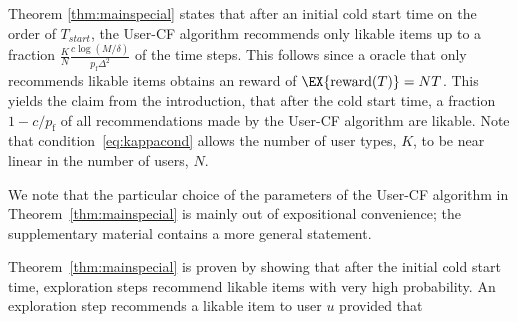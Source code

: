 \documentclass{article}
\newcommand\arewardT{\EX{\mathrm{reward}(T)}}
\newcommand\pf{p_{\mathrm{f}}}
\newcommand\nuser{N} %
\begin{document}


Theorem \ref{thm:mainspecial} states that after an initial cold start time on the order of $T_{start}$, %
the User-CF algorithm recommends only likable items up to a fraction $\frac{K}{N} \frac{c \log(M/\delta)}{ \pf \Delta^2}$ of the time steps. 
This follows since a oracle that only recommends likable items obtains an reward of $\arewardT = NT$. 
This yields the claim from the introduction, that after the cold start time, a fraction $1 - c/\pf$ of all recommendations made by the User-CF algorithm are likable. 
Note that condition~\eqref{eq:kappacond} allows the number of user types, $K$,
to be near linear in the number of users, $N$. 

We note that the particular choice of the parameters of the User-CF algorithm in Theorem~\ref{thm:mainspecial} is mainly out of expositional convenience; 
the supplementary material contains a more general statement. %



%
Theorem~\ref{thm:mainspecial} is proven by showing that after the initial cold start time, exploration steps recommend likable items with very high probability.  
An exploration step recommends a likable item to user $u$ provided that 
\end{document}
